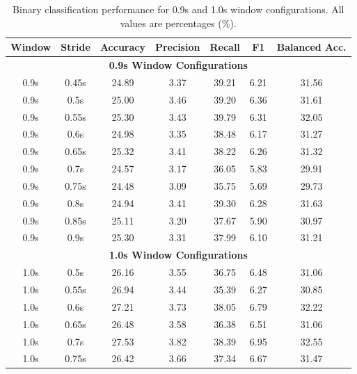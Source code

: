 \documentclass[11pt]{article}
\begin{document}
\begin{table}[H]
    \caption{Binary classification performance for 0.9s and 1.0s window configurations. All values are percentages (\%).}
    \centering
    \label{tab:binary-performance-0.9-1.0}
    \scriptsize
    \setlength{\tabcolsep}{3pt}
    \begin{tabular}{|c|c|c|c|c|c|c|}
        \hline
        \textbf{Window} & \textbf{Stride} & \textbf{Accuracy} & \textbf{Precision} & \textbf{Recall} & \textbf{F1} & \textbf{Balanced Acc.} \\
        \hline
        \multicolumn{7}{|c|}{\textbf{0.9s Window Configurations}} \\
        \hline
        0.9s & 0.45s & 24.89 & 3.37 & 39.21 & 6.21 & 31.56 \\
        \hline
        0.9s & 0.5s & 25.00 & 3.46 & 39.20 & 6.36 & 31.61 \\
        \hline
        0.9s & 0.55s & 25.30 & 3.43 & 39.79 & 6.31 & 32.05 \\
        \hline
        0.9s & 0.6s & 24.98 & 3.35 & 38.48 & 6.17 & 31.27 \\
        \hline
        0.9s & 0.65s & 25.32 & 3.41 & 38.22 & 6.26 & 31.32 \\
        \hline
        0.9s & 0.7s & 24.57 & 3.17 & 36.05 & 5.83 & 29.91 \\
        \hline
        0.9s & 0.75s & 24.48 & 3.09 & 35.75 & 5.69 & 29.73 \\
        \hline
        0.9s & 0.8s & 24.94 & 3.41 & 39.30 & 6.28 & 31.63 \\
        \hline
        0.9s & 0.85s & 25.11 & 3.20 & 37.67 & 5.90 & 30.97 \\
        \hline
        0.9s & 0.9s & 25.30 & 3.31 & 37.99 & 6.10 & 31.21 \\
        \hline
        \multicolumn{7}{|c|}{\textbf{1.0s Window Configurations}} \\
        \hline
        1.0s & 0.5s & 26.16 & 3.55 & 36.75 & 6.48 & 31.06 \\
        \hline
        1.0s & 0.55s & 26.94 & 3.44 & 35.39 & 6.27 & 30.85 \\
        \hline
        1.0s & 0.6s & 27.21 & 3.73 & 38.05 & 6.79 & 32.22 \\
        \hline
        1.0s & 0.65s & 26.48 & 3.58 & 36.38 & 6.51 & 31.06 \\
        \hline
        1.0s & 0.7s & 27.53 & 3.82 & 38.39 & 6.95 & 32.55 \\
        \hline
        1.0s & 0.75s & 26.42 & 3.66 & 37.34 & 6.67 & 31.47 \\

\end{tabular}
\end{table}
\end{document}

